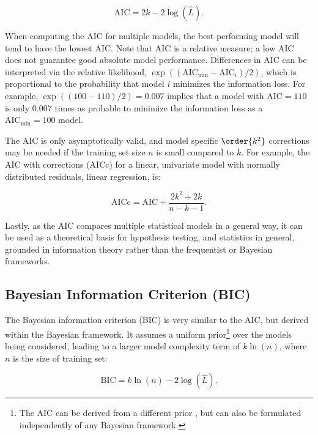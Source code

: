 \begin{equation} \label{eq:AIC}
\text{AIC} = 2k - 2\log\left(\hat{L}\right).
\end{equation}

When computing the AIC for multiple models,
the best performing model will tend to have the lowest AIC.
Note that AIC is a relative measure;
a low AIC does not guarantee good absolute model performance.
Differences in AIC can be interpreted via the relative likelihood,
$\exp\left(\left(\text{AIC}_{\text{min}} - \text{AIC}_{i}\right)/2\right)$,
which is proportional to the probability that model $i$ minimizes the information loss.
For example, $\exp\left(\left(100 - 110\right)/2\right) = \num{0.007}$ implies that
a model with $\text{AIC} = 110$ is only $\num{0.007}$ times as probable
to minimize the information loss as a $\text{AIC}_{\text{min}} = 100$ model.

The AIC is only asymptotically valid,
and model specific $\order{k^{2}}$ corrections may be needed
if the training set size $n$ is small compared to $k$.
For example, the AIC with corrections (AICc) for a linear,
univariate model with normally distributed residuals, \ie linear regression, is:

\begin{equation} \label{eq:AICc}
\text{AICc} = \text{AIC} + \frac{2k^{2}+2k}{n-k-1}.
\end{equation}

Lastly, as the AIC compares multiple statistical models in a general way,
it can be used as a theoretical basis for hypothesis testing, and statistics in general,
grounded in information theory rather than the frequentist or Bayesian frameworks.

\subsection{Bayesian Information Criterion (BIC)}
\label{ml_general:eval:BIC}
The Bayesian information criterion (BIC) \cite{10.1214/aos/1176344136}
is very similar to the AIC, but derived within the Bayesian framework.
It assumes a uniform prior\footnote{The AIC can be derived from a different prior \cite{doi:10.1177/0049124104268644},
but can also be formulated independently of any Bayesian framework.} over the models being considered,
leading to a larger model complexity term \cite{1311138} of
$k\ln\left(n\right)$, where $n$ is the size of training set:

\begin{equation} \label{eq:BIC}
\text{BIC} = k\ln\left(n\right) - 2\log\left(\hat{L}\right).
\end{equation}

